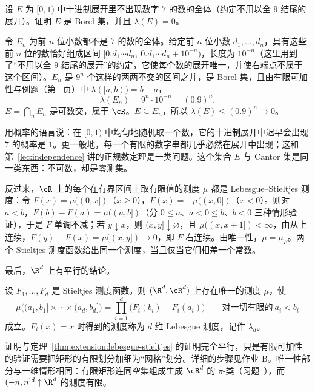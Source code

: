\begin{workedexample}\label{we:extension:no-seven}
设 $E$ 为 $[0,1)$ 中十进制展开里不出现数字 $7$ 的数的全体（约定不用以全 $9$ 结尾的展开）。证明 $E$ 是 Borel 集，并且 $\lambda(E)=0$。
\end{workedexample}
\begin{solution}
令 $E_n$ 为前 $n$ 位小数都不是 $7$ 的数的全体。给定前 $n$ 位小数 $d_1,\dots,d_n$，具有这些前 $n$ 位的数恰好组成区间 $[0.d_1\cdots d_n,\ 0.d_1\cdots d_n+10^{-n})$，长度为 $10^{-n}$（这里用到了“不用以全 $9$ 结尾的展开”的约定，它使每个数的展开唯一，并使右端点不属于这个区间）。$E_n$ 是 $9^n$ 个这样的两两不交的区间之并，是 Borel 集，且由有限可加性与例题（第~\pageref{we:extension:atoms} 页）中 $\lambda([a,b))=b-a$，
\[
\lambda(E_n)=9^n\cdot10^{-n}=(0.9)^n .
\]
$E=\bigcap_nE_n$ 是可数交，属于 $\cR$。$E\subseteq E_n$，所以 $\lambda(E)\leqslant(0.9)^n\to0$。

用概率的语言说：在 $[0,1)$ 中均匀地随机取一个数，它的十进制展开中迟早会出现 $7$ 的概率是 $1$。更一般地，每一个有限的数字串都几乎必然在展开中出现；这和第~\ref{lec:independence} 讲的正规数定理是一类问题。这个集合 $E$ 与 Cantor 集是同一类东西：不可数，却是零测集。
\end{solution}

反过来，$\cR$ 上的每个在有界区间上取有限值的测度 $\mu$ 都是 Lebesgue--Stieltjes 测度：令 $F(x)=\mu((0,x])$（$x\geqslant0$），$F(x)=-\mu((x,0])$（$x<0$）。则对 $a<b$，$F(b)-F(a)=\mu((a,b])$（分 $0\leqslant a$、$a<0\leqslant b$、$b<0$ 三种情形验证），于是 $F$ 单调不减；若 $y\downarrow x$，则 $(x,y]\downarrow\varnothing$，且 $\mu((x,x+1])<\infty$，由从上连续，$F(y)-F(x)=\mu((x,y])\to0$，即 $F$ 右连续。由唯一性，$\mu=\mu_F$。两个 Stieltjes 测度函数给出同一个测度，当且仅当它们相差一个常数。

最后，$\R^d$ 上有平行的结论。

\begin{theorem}\label{thm:extension:Rd}
设 $F_1,\dots,F_d$ 是 Stieltjes 测度函数。则 $(\R^d,\cR^d)$ 上存在唯一的测度 $\mu$，使
\[
\mu\bigl((a_1,b_1]\times\cdots\times(a_d,b_d]\bigr)=\prod_{i=1}^d\bigl(F_i(b_i)-F_i(a_i)\bigr)\qquad\text{对一切有限的}\ a_i<b_i
\]
成立。$F_i(x)=x$ 时得到的测度称为 $d$ 维 Lebesgue 测度，记作 $\lambda_d$。
\end{theorem}

证明与定理~\ref{thm:extension:lebesgue-stieltjes} 的证明完全平行，只是有限可加性的验证需要把矩形的有限划分加细为“网格”划分。详细的步骤见作业 B。唯一性部分与一维情形相同：有限矩形连同空集组成生成 $\cR^d$ 的 $\pi$-类（习题~），而 $(-n,n]^d\uparrow\R^d$ 的测度有限。

